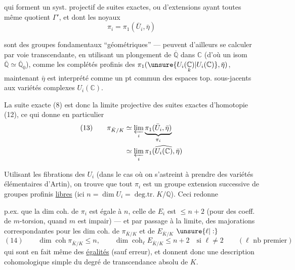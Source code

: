 qui forment un syst. projectif de suites exactes, ou d'extensions ayant toutes même quotient $\Gamma'$, et dont les noyaux
\[
\pi_i=\pi_1(\bar U_i,\bar\eta)
\]

sont des groupes fondamentaux ``géométriques'' ---  peuvent d'ailleurs se calculer par voie transcendante, en utilisant un plongement de $\overline{\mathbb Q}$ dans $\mathbb C$ (d'où un isom $\overline{\mathbb Q}\simeq\overline{\mathbb Q}_0$), comme les complétés profinis des $\pi_1(\unsure{U_i(\underset{k}{\mathbb C})|U_i(\mathbb C)},\bar\eta)$,  maintenant $\bar\eta$ est interprété comme un pt  commun des espaces top. sous-jacents aux variétés complexes $U_i(\mathbb C)$.

La suite exacte (8) est donc la limite projective des suites exactes d'homotopie (12), ce qui donne en particulier
\[
\begin{aligned}
(13)\qquad \pi_{\bar K/K}&\simeq\varprojlim_i\underbrace{\pi_1(\bar U_i,\bar\eta)}_{\pi_i}\\
&\simeq\varprojlim_i\widehat{\pi_1(U_i(\mathbb C),\bar\eta)}
\end{aligned}
\]

Utilisant les fibrations des $U_i$ (dans le cas où on s'astreint à prendre des variétés élémentaires d'Artin), on trouve que tout $\pi_i$ est un groupe  extension successive de  groupes profinis \uline{libres} (ici $n=\dim U_i=\operatorname{deg.tr.}K/\mathbb Q$). Ceci redonne

p.ex. que la dim coh. de $\pi_i$ est égale à $n$, celle de $E_i$ est $\leq n+2$ (pour des coeff.  de $m$-torsion, quand $m$ est impair) --- et par passage à la limite, des majorations correspondantes pour les dim coh. de $\pi_{\bar K/K}$ et de $E_{\bar K/K}$ $\unsure{\ell|:}$
\[
(14)\qquad \dim\operatorname{coh}\pi_{\bar K/K}\leq n,\qquad
\dim\operatorname{coh}_{\ell}E_{\bar K/K}\leq n+2\quad\text{si }\ell\neq2
\qquad(\ell\text{ nb premier})
\]
qui sont en fait même des \uline{égalités} (sauf erreur), et donnent donc une description cohomologique simple du degré de transcendance absolu de $K$.

